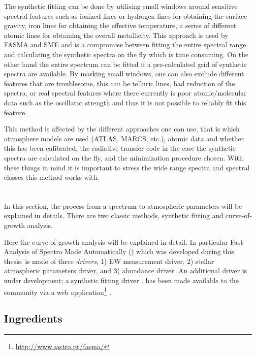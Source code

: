 The synthetic fitting can be done by utilising small windows around sensitive
spectral features such as ionized lines or hydrogen lines for obtaining the
surface gravity, iron lines for obtaining the effective temperature, a series of
different atomic lines for obtaining the overall metallicity. This approach is
used by FASMA and SME \citep[][respectively]{Valenti1996,Tsantaki2017} and is a
compromise between fitting the entire spectral range and calculating the
synthetic spectra on the fly which is time consuming. On the other hand the
entire spectrum can be fitted if a pre-calculated grid of synthetic spectra are
available. By masking small windows, one can also exclude different features
that are troublesome, this can be telluric lines, bad reduction of the spectra,
or real spectral features where there currently is poor atomic/molecular data
such as the oscillator strength and thus it is not possible to reliably fit this
feature.

This method is affected by the different approaches one can use, that is which
atmosphere models are used (ATLAS, MARCS, etc.), atomic data and whether this
has been calibrated, the radiative transfer code in the case the synthetic
spectra are calculated on the fly, and the minimization procedure chosen. With
these things in mind it is important to stress the wide range spectra and
spectral classes this method works with.




\section{\FASMA}
\label{sec:parameters}

In this section, the process from a spectrum to atmospheric parameters will be
explained in details. There are two classic methods, synthetic fitting and
curve-of-growth analysis.

Here the curve-of-growth analysis will be explained in detail. In particular
Fast Analysis of Spectra Made Automatically (\FASMA) which was developed during
this thesis. \FASMA is made of three \emph{drivers}, 1) EW measurement driver,
2) stellar atmospheric parameters driver, and 3) abundance driver. An additional
driver is under development; a synthetic fitting driver \citep{Tsantaki2017}.
\FASMA has been made available to the community via a web
application\footnote{\url{http://www.iastro.pt/fasma/}} \citep{Andreasen2017a}.


\subsection{Ingredients}

